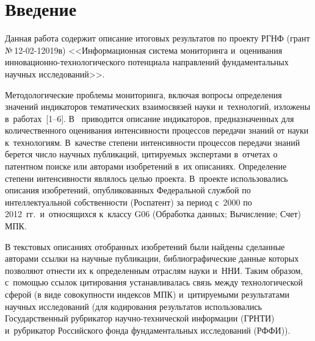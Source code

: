 \begin{multicols}{2}

\label{st\stat}

\section{Введение}

  Данная работа содержит описание итоговых результатов по проекту РГНФ (грант
  №\,12-02-12019в) <<Информационная система мониторинга и~оценивания
  ин\-но\-ва\-ци\-он\-но-тех\-но\-ло\-ги\-че\-ско\-го потенциала направлений
фундаментальных научных исследований>>.

  Методологические проблемы мониторинга, включая вопросы определения значений
индикаторов тематических взаимосвязей науки и~технологий, изложены в~работах~[1--6].
В~\cite{1-zat} приводится описание индикаторов, предназначенных для количественного
оценивания ин\-тен\-сив\-ности процессов передачи знаний от науки к~технологиям. В~качестве
степени интенсивности процессов передачи знаний берется число научных публикаций,
цитируемых экспертами в~отчетах о патентном поиске или авторами изобретений в~их
описаниях. Определение степени интенсивности являлось целью проекта. В~проекте
использовались описания изо\-бре\-те\-ний, опубликованных Федеральной службой по
интеллектуальной собственности (Роспатент) за период с~2000 по 2012~гг.\
и~относящихся к~классу G06 (Обработка данных; Вычисление; Счет) МПК.

  В текстовых описаниях отобранных изобретений были найдены сделанные авторами
ссылки на научные публикации, библиографические данные которых позволяют отнести их
к определенным отраслям науки и~ННИ.
Таким образом, с~помощью ссылок цитирования устанавливалась связь между технологической сферой (в виде
совокупности индексов МПК) и~цитируемыми результатами научных исследований (для
кодирования результатов использовались Государственный рубрикатор
  на\-уч\-но-тех\-ни\-че\-ской информации (ГРНТИ) и~рубрикатор Российского фонда
фундаментальных исследований (РФФИ)).


\end{multicols}
